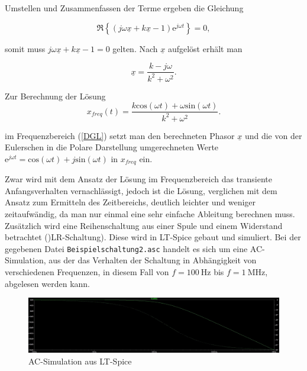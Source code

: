 Umstellen und Zusammenfassen der Terme ergeben die Gleichung

\begin{equation*}
	\Re \left\{(j\omega \underline{x} + k\underline{x} - 1)\mathrm{e}^{j\omega t}\right\} = 0,
\end{equation*}

somit muss $j\omega \underline{x} + k\underline{x} - 1 = 0$ gelten. Nach $\underline{x}$ aufgelöst erhält man 

\begin{equation*}
	\underline{x} = \frac{k-j\omega}{k^2+\omega^2}.
\end{equation*}

Zur Berechnung der Lösung 
\begin{equation}
x_{freq} (t) = \frac{k\mathrm{cos}(\omega t) + \omega\mathrm{sin}(\omega t)}{k^2+ \omega^2}.
\label{lsgfreq}
\end{equation}

im Frequenzbereich (\ref{DGL}) setzt man den berechneten Phasor $\underline{x}$ und die von der Eulerschen in die Polare Darstellung umgerechneten Werte $\mathrm{e}^{j\omega t} = \mathrm{cos}(\omega t) + j\mathrm{sin}(\omega t)$ in $x_{freq}$ ein.



Zwar wird mit dem Ansatz der Lösung im Frequenzbereich das transiente Anfangsverhalten vernachlässigt, jedoch ist die Lösung, verglichen mit dem Ansatz zum Ermitteln des Zeitbereichs, deutlich leichter und weniger zeitaufwändig, da man nur einmal eine sehr einfache Ableitung berechnen muss.\\


Zusätzlich wird eine Reihenschaltung aus einer Spule und einem Widerstand betrachtet ()LR-Schaltung). Diese wird in LT-Spice gebaut und simuliert. Bei der gegebenen Datei  \texttt{Beispielschaltung2.asc} handelt es sich um eine AC-Simulation, aus der das Verhalten der Schaltung in Abhängigkeit von verschiedenen Frequenzen, in diesem Fall von $f=\SI{100}{\hertz}$ bis $f=\SI{1}{\mega\hertz}$, abgelesen werden kann. 

\begin{figure}[h]
	\includegraphics[width=\textwidth]{data/spiceplot32}
	\caption{AC-Simulation aus LT-Spice}
	\label{spiceplot}
\end{figure}

